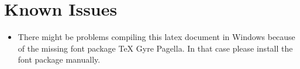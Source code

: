 \documentclass[ba,logo]{mlai-thesis}
\begin{document}
	\begingroup 
	
	\backmatter
		
	\printbibliography[heading=bibintoc]
	
	\listoffigures
	
	\listoftables
	
	\endgroup 
	
	\appendix
	
	\chapter{Known Issues}  
	\begin{itemize}
	\item There might be problems compiling this latex document in Windows because of the missing font package TeX Gyre Pagella. In that case please install the font package manually.
	\end{itemize}
	
	
\end{document}
